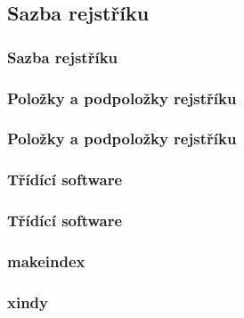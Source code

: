 \subsection{Sazba rejstříku}
\begin{frame}
	\frametitle{Sazba rejstříku}
\end{frame}


\subsubsection{Položky a podpoložky rejstříku}
\begin{frame}
	\frametitle{Položky a podpoložky rejstříku}
\end{frame}


\subsubsection{Třídící software}
\begin{frame}
	\frametitle{Třídící software}
\end{frame}


\begin{frame}
	\frametitle{makeindex}
\end{frame}


\begin{frame}
	\frametitle{xindy}
\end{frame}

\endinput